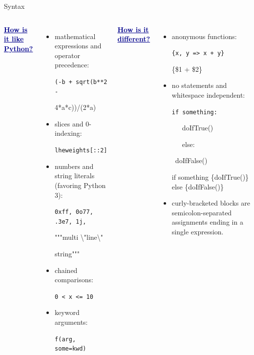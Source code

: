 \documentclass{beamer}
\begin{document}
\begin{frame}[fragile]{Syntax}
\vspace{0.3 cm}
\begin{columns}[t]
\textcolor{darkblue}{\underline{\bf How is it like Python?}}
\begin{itemize}
\item mathematical expressions and operator precedence:

{\small\tt (-b + sqrt(b**2 -

\hfill 4*a*c))/(2*a)}

\item slices and 0-indexing:

{\small\tt lheweights[::2]}

\item numbers and string literals (favoring Python 3):

{\small\tt 0xff, 0o77, .3e7, 1j,

"""multi \textbackslash"line\textbackslash"

string"""}

\item chained comparisons:

{\small\tt 0 < x <= 10}

\item keyword arguments:

{\small\tt f(arg, some=kwd)}

\end{itemize}

\textcolor{darkblue}{\underline{\bf How is it different?}}
\begin{itemize}
\item anonymous functions:

{\small\tt \{x, y => x + y\}

\{\$1 + \$2\}}

\item no statements and whitespace independent:

{\small\tt if something:

\ \ \ doIfTrue()

\ \ \ else:

\ doIfFalse()

if something \{doIfTrue()\} else \{doIfFalse()\}}

\item curly-bracketed blocks are semicolon-separated assignments ending in a single expression.
\end{itemize}
\end{columns}
\end{frame}
\end{document}
